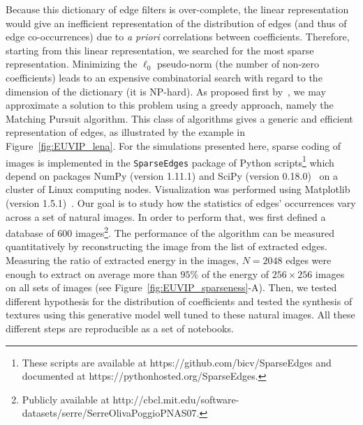 \documentclass{article}
\newcommand{\url}[1]{{\rm #1}}
\begin{document}
Because this dictionary of edge filters is over-complete, the linear representation would give an inefficient representation of the distribution of edges (and thus of edge co-occurrences) due to {\it a  priori} correlations between coefficients. Therefore, starting from this linear representation, we searched for the most sparse representation. Minimizing the $\ell_0$ pseudo-norm (the number of non-zero coefficients) leads to an expensive combinatorial search with regard to the dimension of the dictionary (it is NP-hard). As proposed first by~\citep{Perrinet02sparse}, we may approximate a solution to this problem using a greedy approach, namely the Matching Pursuit algorithm. This class of algorithms gives a generic and efficient representation of edges, as illustrated by the example in Figure~\ref{fig:EUVIP_lena}. For the simulations presented here, sparse coding of images is implemented in the \verb+SparseEdges+ package of Python scripts\footnote{These scripts are available at \url{https://github.com/bicv/SparseEdges} and documented at \url{https://pythonhosted.org/SparseEdges}.} which depend on packages NumPy (version 1.11.1) and SciPy (version 0.18.0)~\citep{Oliphant07} on a cluster of Linux computing nodes. Visualization was performed using Matplotlib (version 1.5.1)~\citep{Hunter07}. Our goal is to study how the statistics of edges' occurrences vary across a set of natural images. In order to perform that, wes first defined a database of $600$ images\footnote{Publicly available at \url{http://cbcl.mit.edu/software-datasets/serre/SerreOlivaPoggioPNAS07}.}. The performance of the algorithm can be measured quantitatively by reconstructing the image from the list of extracted edges. Measuring the ratio of extracted energy in the images, $N=2048$ edges were enough to extract on average more than $95\%$ of the energy of $256\times 256$ images on all sets of images (see Figure~\ref{fig:EUVIP_sparseness}-A). Then, we tested different hypothesis for the distribution of coefficients and tested the synthesis of textures using this generative model well tuned to these natural images. All these different steps are reproducible as a set of notebooks.%
\end{document}
